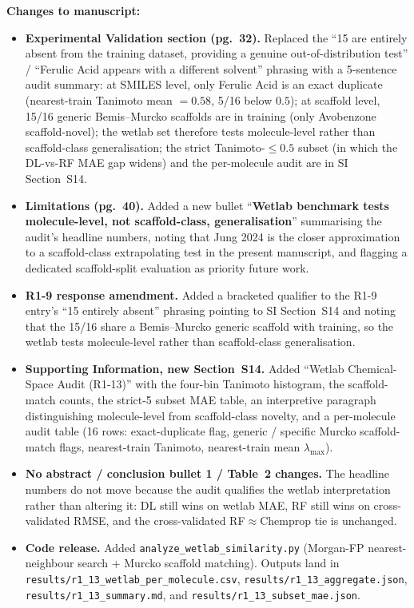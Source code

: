 \documentclass[11pt]{article}
\newenvironment{changes}{%
  \noindent\textbf{Changes to manuscript:}
  \begin{itemize}[leftmargin=2em,itemsep=2pt]}{%
  \end{itemize}\medskip}
\begin{document}
\begin{changes}
  \item \textbf{Experimental Validation section (pg.\ 32).} Replaced the ``15 are entirely absent from the training dataset, providing a genuine out-of-distribution test'' / ``Ferulic Acid appears with a different solvent'' phrasing with a 5-sentence audit summary: at SMILES level, only Ferulic Acid is an exact duplicate (nearest-train Tanimoto mean $= 0.58$, 5/16 below $0.5$); at scaffold level, 15/16 generic Bemis--Murcko scaffolds are in training (only Avobenzone scaffold-novel); the wetlab set therefore tests molecule-level rather than scaffold-class generalisation; the strict Tanimoto-$\leq 0.5$ subset (in which the DL-vs-RF MAE gap widens) and the per-molecule audit are in SI Section~S14.
  \item \textbf{Limitations (pg.\ 40).} Added a new bullet ``\textbf{Wetlab benchmark tests molecule-level, not scaffold-class, generalisation}'' summarising the audit's headline numbers, noting that Jung 2024 is the closer approximation to a scaffold-class extrapolating test in the present manuscript, and flagging a dedicated scaffold-split evaluation as priority future work.
  \item \textbf{R1-9 response amendment.} Added a bracketed qualifier to the R1-9 entry's ``15 entirely absent'' phrasing pointing to SI Section~S14 and noting that the 15/16 share a Bemis--Murcko generic scaffold with training, so the wetlab tests molecule-level rather than scaffold-class generalisation.
  \item \textbf{Supporting Information, new Section~S14.} Added ``Wetlab Chemical-Space Audit (R1-13)'' with the four-bin Tanimoto histogram, the scaffold-match counts, the strict-5 subset MAE table, an interpretive paragraph distinguishing molecule-level from scaffold-class novelty, and a per-molecule audit table (16 rows: exact-duplicate flag, generic / specific Murcko scaffold-match flags, nearest-train Tanimoto, nearest-train mean $\lambda_{\max}$).
  \item \textbf{No abstract / conclusion bullet 1 / Table~2 changes.} The headline numbers do not move because the audit qualifies the wetlab interpretation rather than altering it: DL still wins on wetlab MAE, RF still wins on cross-validated RMSE, and the cross-validated RF$\approx$Chemprop tie is unchanged.
  \item \textbf{Code release.} Added \texttt{analyze\_wetlab\_similarity.py} (Morgan-FP nearest-neighbour search + Murcko scaffold matching). Outputs land in \texttt{results/r1\_13\_wetlab\_per\_molecule.csv}, \texttt{results/r1\_13\_aggregate.json}, \texttt{results/r1\_13\_summary.md}, and \texttt{results/r1\_13\_subset\_mae.json}.
\end{changes}
\end{document}
